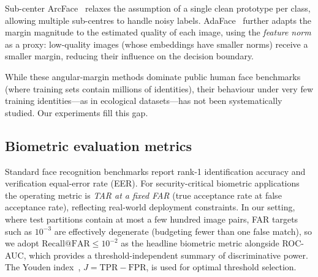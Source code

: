 Sub-center ArcFace~\cite{sun2020subcenter} relaxes the assumption of a single clean
prototype per class, allowing multiple sub-centres to handle noisy labels.
AdaFace~\cite{kim2022adaface} further adapts the margin magnitude to the estimated quality
of each image, using the \emph{feature norm} as a proxy: low-quality images (whose
embeddings have smaller norms) receive a smaller margin, reducing their influence on
the decision boundary.

While these angular-margin methods dominate public human face benchmarks (where training
sets contain millions of identities), their behaviour under very few training identities---as
in ecological datasets---has not been systematically studied.  Our experiments fill this gap.

\subsection{Biometric evaluation metrics}

Standard face recognition benchmarks report rank-1 identification accuracy and
verification equal-error rate (EER).  For security-critical biometric applications
the operating metric is \emph{TAR at a fixed FAR} (true acceptance rate at false acceptance
rate), reflecting real-world deployment constraints.
In our setting, where test partitions contain at most a few hundred image pairs, FAR
targets such as $10^{-3}$ are effectively degenerate (budgeting fewer than one false match),
so we adopt $\mathrm{Recall@FAR{\le}10^{-2}}$ as the headline biometric metric alongside
ROC-AUC, which provides a threshold-independent summary of discriminative power.
The Youden index~\cite{youden1950}, $J = \mathrm{TPR} - \mathrm{FPR}$, is used for
optimal threshold selection.
